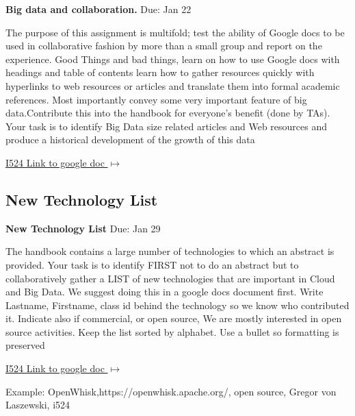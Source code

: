 \begin{exercise} \label{a:i524-big-data-and-collaboration}

{\bf Big data and collaboration.} Due: Jan 22

The purpose of this assignment is multifold; test the ability of Google docs to be used in collaborative fashion by more than a small group and report on the experience. Good Things and bad things, learn on how to use Google docs with headings and table of contents learn how to gather resources quickly with hyperlinks to web resources or articles and translate them into formal academic references. Most importantly convey some very important feature of big data.Contribute this into the handbook for everyone's benefit (done by TAs). Your task is to identify Big Data size related articles and Web resources and produce a historical development of the growth of this data

\smallskip

{\hfill \href{https://docs.google.com/document/d/1ZHNdhX_Jx7uBQo0kthSYQ6TQR8_KNbgOwH2EuqBQcjY/edit?usp=sharing}{I524 Link to google doc $\mapsto$}}

\end{exercise}

\subsection{New Technology List}

\begin{exercise} \label{a:i524-new-tech-list}
{\bf New Technology List} Due: Jan 29

The handbook contains a large number of technologies to which an abstract is provided. Your task is to identify FIRST not to do an abstract but to collaboratively gather a LIST of new technologies that are important in Cloud and Big Data. We suggest doing this in a google docs document first. Write Lastname, Firstname, class id behind the technology so we know who contributed it. Indicate also if commercial, or open source, We are mostly interested in open source activities. Keep the list sorted by alphabet. Use a bullet so formatting is preserved

{\hfill \href{https://docs.google.com/document/d/1LeHGHTSBbaPXYVor0efhmi5W7JJjS7EQHABHqgRAPuU/edit?usp=sharing}{I524 Link to google doc $\mapsto$}}

\smallskip
 
Example: OpenWhisk,https://openwhisk.apache.org/, open source, Gregor von Laszewski, i524
 
\end{exercise}

